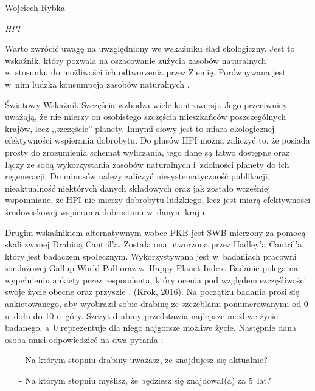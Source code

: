 \begin{artplenv}{Wojciech Rybka}
\begin{footnotesize}
\begin{widerequation}
\textit{HPI}\ {\approx}\ 
\end{widerequation}
\end{footnotesize}

Warto zwrócić uwagę na uwzględniony we wskaźniku ślad ekologiczny. Jest to wskaźnik, który pozwala na oszacowanie
zużycia zasobów naturalnych w~stosunku do możliwości ich odtworzenia przez Ziemię. Porównywana jest w~nim ludzka
konsumpcja zasobów naturalnych
\parencite{noauthor_about_2019}.

Światowy Wskaźnik Szczęścia wzbudza wiele kontrowersji. Jego przeciwnicy uważają, że nie mierzy on osobistego szczęścia
mieszkańców poszczególnych krajów, lecz ,,szczęście'' planety. Innymi słowy jest to miara ekologicznej efektywności
wspierania dobrobytu. Do plusów HPI można zaliczyć to, że posiada prosty do zrozumienia schemat wyliczania, jego dane
są łatwo dostępne oraz łączy ze sobą wykorzystania zasobów naturalnych i~zdolności planety do ich regeneracji. Do
minusów należy zaliczyć niesystematyczność publikacji, nieaktualność niektórych danych składowych oraz jak zostało
wcześniej wspomniane, że HPI nie mierzy dobrobytu ludzkiego, lecz jest miarą efektywności środowiskowej wspierania
dobrostanu w~danym kraju. 

Drugim wskaźnikiem alternatywnym wobec PKB jest SWB mierzony za pomocą skali zwanej Drabiną Cantril’a. Została ona
utworzona przez Hadley’a Cantril’a, który jest badaczem społecznym. Wykorzystywana jest w~badaniach pracowni sondażowej
Gallup World Poll oraz w~Happy Planet Index. Badanie polega na wypełnieniu ankiety przez respondenta, który ocenia pod
względem szczęśliwości swoje życie obecne oraz przyszłe
\parencite{krok_metody_2016}.
\label{ref:RND66wMsg1fRT}(Krok, 2016).
Na początku badania
prosi się ankietowanego, aby wyobraził sobie drabinę ze szczeblami ponumerowanymi od 0 u~dołu do 10 u~góry. Szczyt
drabiny przedstawia najlepsze możliwe życie badanego, a~0 reprezentuje dla niego najgorsze możliwe życie. Następnie
dana osoba musi odpowiedzieć na dwa pytania
\parencite{gallup_inc._understanding_2019}:

\begin{itemize}
	\item[-] Na którym stopniu drabiny uważasz, że znajdujesz się aktualnie?
	\item[-] Na którym stopniu myślisz, że będziesz się znajdował(a) za 5~lat?
\end{itemize}


\end{artplenv}
